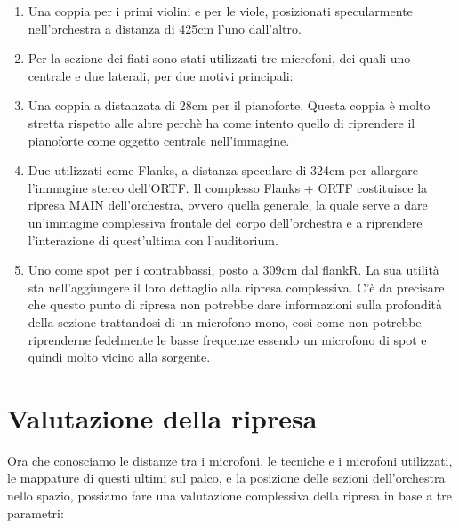 	\begin{enumerate}
		\item Una coppia per i primi violini e per le viole, posizionati specularmente nell'orchestra a distanza di 425cm l'uno dall'altro.
		
		\item Per la sezione dei fiati sono stati utilizzati tre microfoni, dei quali uno centrale e due laterali, per due motivi principali:
		
		\item Una coppia a distanzata di 28cm per il pianoforte. Questa coppia è molto stretta rispetto alle altre perchè ha come intento quello di riprendere il pianoforte come oggetto centrale nell'immagine.
		
		\item Due utilizzati come Flanks, a distanza speculare di 324cm per allargare l'immagine stereo dell'ORTF. Il complesso Flanks + ORTF costituisce la ripresa MAIN dell'orchestra, ovvero quella generale, la quale serve a dare un'immagine complessiva frontale del corpo dell'orchestra e a riprendere l'interazione di quest'ultima con l'auditorium.
		
		\item Uno come spot per i contrabbassi, posto a 309cm dal flankR. La sua utilità sta nell'aggiungere il loro dettaglio alla ripresa complessiva. C'è da precisare che questo punto di ripresa non potrebbe dare informazioni sulla profondità della sezione trattandosi di un microfono mono, così come non potrebbe riprenderne fedelmente le basse frequenze essendo un microfono di spot e quindi molto vicino alla sorgente.
	\end{enumerate}
	
	\section*{Valutazione della ripresa}
	Ora che conosciamo le distanze tra i microfoni, le tecniche e i microfoni utilizzati, le mappature di questi ultimi sul palco, e la posizione delle sezioni dell'orchestra nello spazio, possiamo fare una valutazione complessiva della ripresa in base a tre parametri:
	
